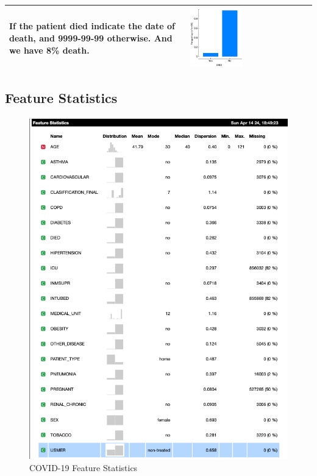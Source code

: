 \begin{longtable}{P{0.45\textwidth}P{0.45\textwidth}}
If the patient died indicate the date of death, and 9999-99-99 otherwise.
And we have 8\% death.
& \includegraphics[width=0.44\textwidth]{img/appendix/feature_died.png} 
\\ \hline
\end{longtable}

\subsection{Feature Statistics}

\begin{figure}[H]
\caption{COVID-19 Feature Statistics}
\label{fig:feature_summary}
\centering
\includegraphics[width=\textwidth]{img/appendix/feature_summary.png}
\end{figure}

